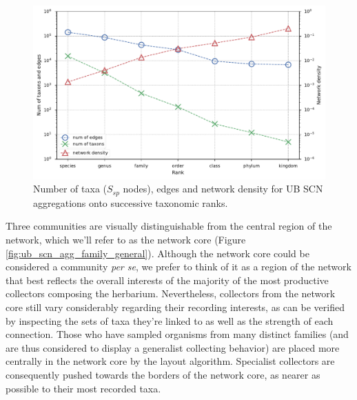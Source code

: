 \begin{figure}[!ht]
  	\centering
    \includegraphics[width=\linewidth]{figures/casestudy_ub/scn_tax_agg_curves.pdf}
    \caption{ Number of taxa ($S_{sp}$ nodes), edges and network density for UB SCN aggregations onto successive taxonomic ranks. }
    \label{fig:ub_scn_tax_agg_curves}
  \end{figure}

Three communities are visually distinguishable from the central region of the network, which we'll refer to as the network core (Figure \ref{fig:ub_scn_agg_family_general}).
Although the network core could be considered a community \textit{per se}, we prefer to think of it as a region of the network that best reflects the overall interests of the majority of the most productive collectors composing the herbarium.
Nevertheless, collectors from the network core still vary considerably regarding their recording interests, as can be verified by inspecting the sets of taxa they're linked to as well as the strength of each connection. Those who have sampled organisms from many distinct families (and are thus considered to display a generalist collecting behavior) are placed more centrally in the network core by the layout algorithm. Specialist collectors are consequently pushed towards the borders of the network core, as nearer as possible to their most recorded taxa.

